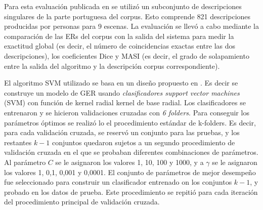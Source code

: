 Para esta evaluaci\'on publicada en \cite{altamirano15} se utiliz\'o un subconjunto de descripciones singulares de la parte portuguesa del corpus. Esto comprende 821 descripciones producidas por personas para 9 escenas. La evaluaci\'on se llev\'o a cabo mediante la comparaci\'on de las ERs del corpus con la salida del sistema para medir la exactitud global (es decir, el n\'umero de coincidencias exactas entre las dos descripciones), los coeficientes Dice \cite{dice} y MASI \cite{masi} (es decir, el grado de solapamiento entre la salida del algoritmo y la descripci\'on corpus correspondiente).

El algoritmo SVM utilizado se basa en un dise\~no propuesto en \cite{thiago-svm}. Es decir se construye un modelo de GER usando {\it clasificadores support vector machines} (SVM) con funci\'on de kernel radial kernel de base radial. Los clasificadores se entrenaron y se hicieron validaciones cruzadas con {\it 6 folders}. Para conseguir los par\'ametros \'optimos se realiz\'o lo el procedimiento est\'andar de k-folders. Es decir, para cada validaci\'on cruzada, se reserv\'o un conjunto para las pruebas, y los restantes $k-1$ conjuntos quedaron sujetos a un segundo procedimiento de validaci\'on cruzada en el que se probaban diferentes combinaciones de par\'ametros. Al par\'ametro $C$ se le asignaron los valores 1, 10, 100 y 1000, y a $\gamma$ se le asignaron los valores 1, 0,1, 0,001 y 0,0001. El conjunto de par\'ametros de mejor desempe\~no fue seleccionado para construir un clasificador entrenado on los conjuntos $k-1$, y probado en los datos de prueba. Este procedimiento se repiti\'o para cada iteraci\'on del procedimiento principal de validaci\'on cruzada.


